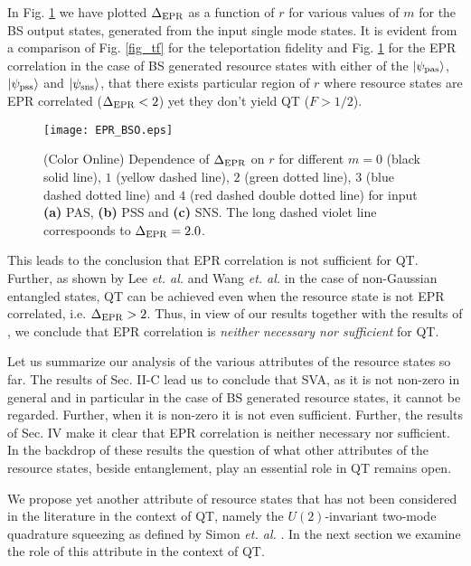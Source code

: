 \documentclass[letter,scriptaddress,twocolumn, prl,showkeys]{revtex4}
\begin{document}
In Fig. \ref{fig_epr} we have plotted $\Delta_{\rm{EPR}}$ as a function of $r$ for various values of $m$ for the BS output states, generated from the input single mode states.
It is evident from a comparison of Fig. \ref{fig_tf} for the teleportation fidelity and Fig. \ref{fig_epr} for the EPR correlation in the case of BS generated resource states with either of the $|\psi_{\rm{pas}}\rangle$, $|\psi_{\rm{pss}}\rangle$ and $|\psi_{\rm{sns}}\rangle$, that there exists particular region of $r$ where resource states are EPR correlated ($\Delta_{\rm{EPR}}<2$) yet they don't yield QT ($F>1/2$). 
\begin{figure}[h]
\texttt{[image: EPR\_BSO.eps]}
\caption{(Color Online) Dependence of $\Delta_{\rm{EPR}}$ on $r$ for different $m=0$ (black solid line), $1$ (yellow dashed line), $2$ (green dotted line), $3$ (blue dashed dotted line) and $4$ (red dashed double dotted line) for input {\bf (a)} PAS, {\bf (b)} PSS and {\bf (c)} SNS. The long dashed violet line correspoonds to $\Delta_{\rm{EPR}}=2.0$. \label{fig_epr}}
\end{figure}

This leads to the conclusion that EPR correlation is not sufficient for QT.
Further, as shown by Lee \emph{et. al.} \cite{tp_lee} and Wang \emph{et. al.} \cite{tp_wang} in the case of non-Gaussian entangled states, QT can be achieved even when the resource state is not EPR correlated, i.e. $\Delta_{\rm{EPR}}>2$.
Thus, in view of our results together with the results of \cite{tp_lee,tp_wang}, we conclude that EPR correlation is \emph{neither necessary nor sufficient} for QT.

Let us summarize our analysis of the various attributes of the resource states so far.
The results of Sec. II-C lead us to conclude that SVA, as it is not non-zero in general and in particular in the case of BS generated resource states, it cannot be regarded.
Further, when it is non-zero it is not even sufficient.
Further, the results of Sec. IV make it clear that EPR correlation is neither necessary nor sufficient.
In the backdrop of these results the question of what other attributes of the resource states, beside entanglement, play an essential role in QT remains open.

We propose yet another attribute of resource states that has not been considered in the literature in the context of QT, namely the $U(2)$-invariant two-mode quadrature squeezing as defined by Simon \emph{et. al.} \cite{qs_simon}.
In the next section we examine the role of this attribute in the context of QT.
\end{document}
